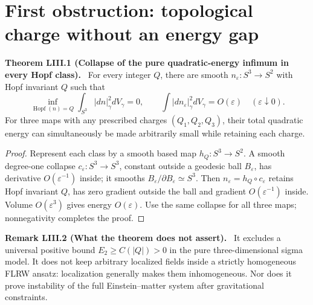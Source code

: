\documentclass[11pt,a4paper,oneside]{book}
\newcommand{\statement}[3]{\par\medskip\noindent\textbf{#1 #2 (#3).}\ }
\begin{document}
\section{First obstruction: topological charge without an energy gap}
\statement{Theorem}{LIII.1}{Collapse of the pure quadratic-energy infimum in every Hopf class}
For every integer $Q$, there are smooth $n_\varepsilon:S^3\to S^2$ with Hopf invariant $Q$ such that
\begin{equation}\inf_{\operatorname{Hopf}(n)=Q}\int_{S^3}|dn|_\gamma^2dV_\gamma=0,\qquad\int|dn_\varepsilon|_\gamma^2dV_\gamma=O(\varepsilon)\quad(\varepsilon\downarrow0).\tag{294}\end{equation}
For three maps with any prescribed charges $(Q_1,Q_2,Q_3)$, their total quadratic energy can simultaneously be made arbitrarily small while retaining each charge.
\begin{proof}
Represent each class by a smooth based map $h_Q:S^3\to S^2$. A smooth degree-one collapse $c_\varepsilon:S^3\to S^3$, constant outside a geodesic ball $B_\varepsilon$, has derivative $O(\varepsilon^{-1})$ inside; it smooths $B_\varepsilon/\partial B_\varepsilon\simeq S^3$. Then $n_\varepsilon=h_Q\circ c_\varepsilon$ retains Hopf invariant $Q$, has zero gradient outside the ball and gradient $O(\varepsilon^{-1})$ inside. Volume $O(\varepsilon^3)$ gives energy $O(\varepsilon)$. Use the same collapse for all three maps; nonnegativity completes the proof.
\end{proof}
\statement{Remark}{LIII.2}{What the theorem does not assert}
It excludes a universal positive bound $E_2\ge C(|Q|)>0$ in the pure three-dimensional sigma model. It does not keep arbitrary localized fields inside a strictly homogeneous FLRW ansatz: localization generally makes them inhomogeneous. Nor does it prove instability of the full Einstein--matter system after gravitational constraints.
\end{document}
